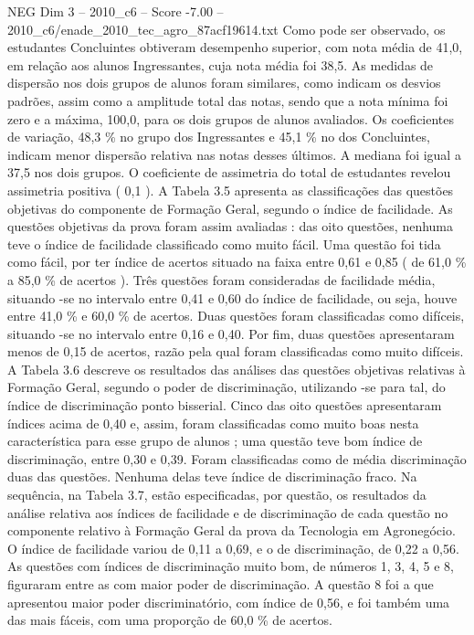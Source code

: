 \begin{textsample}{NEG Dim 3 – 2010\_c6 – Score -7.00 – 2010\_c6/enade\_2010\_tec\_agro\_87acf19614.txt}
Como pode ser observado, os estudantes Concluintes obtiveram desempenho superior, com nota média de 41,0, em relação aos alunos Ingressantes, cuja nota média foi 38,5.
As medidas de dispersão nos dois grupos de alunos foram similares, como indicam os desvios padrões, assim como a amplitude total das notas, sendo que a nota mínima foi zero e a máxima, 100,0, para os dois grupos de alunos avaliados.
Os coeficientes de variação, 48,3 \% no grupo dos Ingressantes e 45,1 \% no dos Concluintes, indicam menor dispersão relativa nas notas desses últimos.
A mediana foi igual a 37,5 nos dois grupos.
O coeficiente de assimetria do total de estudantes revelou assimetria positiva ( 0,1 ).
A Tabela 3.5 apresenta as classificações das questões objetivas do componente de Formação Geral, segundo o índice de facilidade.
As questões objetivas da prova foram assim avaliadas : das oito questões, nenhuma teve o índice de facilidade classificado como muito fácil.
Uma questão foi tida como fácil, por ter índice de acertos situado na faixa entre 0,61 e 0,85 ( de 61,0 \% a 85,0 \% de acertos ).
Três questões foram consideradas de facilidade média, situando -se no intervalo entre 0,41 e 0,60 do índice de facilidade, ou seja, houve entre 41,0 \% e 60,0 \% de acertos.
Duas questões foram classificadas como difíceis, situando -se no intervalo entre 0,16 e 0,40.
Por fim, duas questões apresentaram menos de 0,15 de acertos, razão pela qual foram classificadas como muito difíceis.
A Tabela 3.6 descreve os resultados das análises das questões objetivas relativas à Formação Geral, segundo o poder de discriminação, utilizando -se para tal, do índice de discriminação ponto bisserial.
Cinco das oito questões apresentaram índices acima de 0,40 e, assim, foram classificadas como muito boas nesta característica para esse grupo de alunos ; uma questão teve bom índice de discriminação, entre 0,30 e 0,39.
Foram classificadas como de média discriminação duas das questões.
Nenhuma delas teve índice de discriminação fraco.
Na sequência, na Tabela 3.7, estão especificadas, por questão, os resultados da análise relativa aos índices de facilidade e de discriminação de cada questão no componente relativo à Formação Geral da prova da Tecnologia em Agronegócio.
O índice de facilidade variou de 0,11 a 0,69, e o de discriminação, de 0,22 a 0,56.
As questões com índices de discriminação muito bom, de números 1, 3, 4, 5 e 8, figuraram entre as com maior poder de discriminação.
A questão 8 foi a que apresentou maior poder discriminatório, com índice de 0,56, e foi também uma das mais fáceis, com uma proporção de 60,0 \% de acertos.

\end{textsample}
